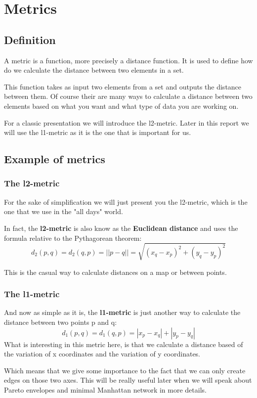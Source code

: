 \chapter{Metrics}
\section{Definition}%
A metric is a function, more precisely a distance function. It is used to define how do we calculate the distance between two elements in a set.

This function takes as input two elements from a set and outputs the distance between them. Of course their are many ways to calculate a distance between two elements based on what you want and what type of data you are working on.

For a classic presentation we will introduce the l2-metric. Later in this report we will use the l1-metric as it is the one that is important for us.
\section{Example of metrics}%
\subsection{The l2-metric}%
For the sake of simplification we will just present you the l2-metric, which is the one that we use in the "all days" world.

In fact, the \textbf{l2-metric} is also know as the \textbf{Euclidean distance} and uses the formula relative to the Pythagorean theorem:
	\[d_2(p,q)= d_2(q,p) = ||p - q|| = \sqrt{(x_q-x_p)^2+(y_q-y_p)^2}\]
	
This is the casual way to calculate distances on a map or between points.
\subsection{The l1-metric}%
	And now as simple as it is, the \textbf{l1-metric} is just another way to calculate the distance between two points p and q:
	\[ d_{1}(p,q)= d_{1}(q,p) = |x_p-x_q|+|y_p-y_q|\]
What is interesting in this metric here, is that we calculate a distance based of the variation of x coordinates and the variation of y coordinates.

Which means that we give some importance to the fact that we can only create edges on those two axes. This will be really useful later when we will speak about Pareto envelopes and minimal Manhattan network in more details.